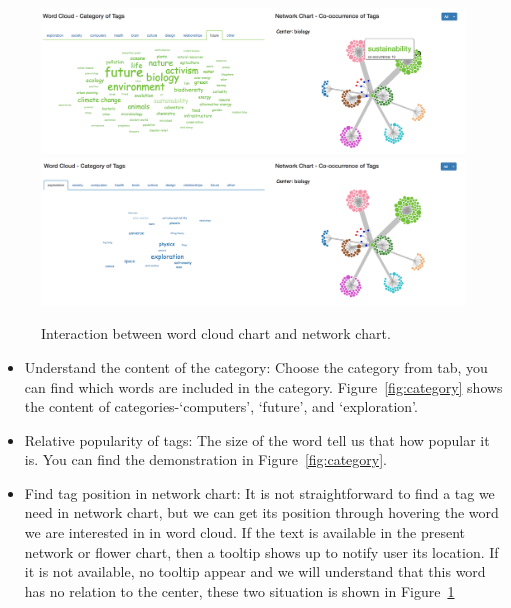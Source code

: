 \documentclass{report}
\numberwithin{figure}{section}
\begin{document}
\begin{figure}
\begin{center}
\includegraphics[scale=0.3]{hasnode}
\includegraphics[scale=0.3]{nonode}
\caption{Interaction between word cloud chart and network chart.}
\label{fig:tooltipincloud}
\end{center}
\end{figure} 

\begin{itemize}
\item
Understand the content of the category:
\newline \quad Choose the category from tab, you can find which words are included in the category. Figure~\ref{fig:category} shows the content of categories-`computers', `future', and `exploration'. 
\item
Relative popularity of tags:
\newline \quad The size of the word tell us that how popular it is. You can find the demonstration in Figure~\ref{fig:category}. 

\item
Find tag position in network chart:
\newline \quad It is not straightforward to find a tag we need in network chart, but we can get its position through hovering the word we are interested in in word cloud. If the text is available in the present network or flower chart, then a tooltip shows up to notify user its location. If it is not available, no tooltip appear and we will understand that this word has no relation to the center, these two situation is shown in Figure~\ref{fig:tooltipincloud}

\end{itemize}
\end{document}
